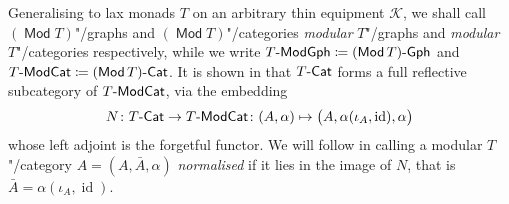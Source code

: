 \documentclass[preprint, a4paper]{elsarticle}
\theoremstyle{definition}
\theoremstyle{remark}
\providecommand{\dfn}{\coloneqq}
\providecommand{\bigpars}[1]{\bigl(#1\bigr)}
\providecommand{\map}[3]{#1\colon#2\to#3}
\DeclareMathOperator{\id}{id}
\providecommand{\catvar}[1]{\mathcal{#1}}
\providecommand{\2}{\mathsf 2}
\providecommand{\K}{\catvar K}
\providecommand{\Cat}{\mathsf{Cat}}
\providecommand{\enCat}[1]{#1\text-\Cat}
\DeclareMathOperator{\Mod}{\mathsf{Mod}}
\providecommand{\ModCat}[1]{#1\text-\mathsf{ModCat}}
\providecommand{\Gph}[1]{#1\text-\mathsf{Gph}}
\providecommand{\ModGph}[1]{#1\text-\mathsf{ModGph}}
\begin{document}
  Generalising to lax monads $T$ on an arbitrary thin equipment $\K$, we shall call $(\Mod T)$"/graphs and $(\Mod T)$"/categories \emph{modular} $T$"/graphs and \emph{modular} $T$"/categories respectively, while we write $\ModGph T \dfn \Gph{(\Mod T)}$ and $\ModCat T \dfn \enCat{(\Mod T)}$. It is shown in \cite{Tholen09} that $\enCat T$ forms a full reflective subcategory of $\ModCat T$, via the embedding
  \begin{equation} \label{normalised T-category}
  	\map N{\enCat T}{\ModCat T}\colon (A, \alpha) \mapsto \bigpars{A, \alpha(\iota_A, \id), \alpha}
  \end{equation}
  whose left adjoint is the forgetful functor. We will follow \cite{Cruttwell-Shulman10} in calling a modular $T$"/category $A = (A, \bar A, \alpha)$ \emph{normalised} if it lies in the image of $N$, that is $\bar A = \alpha(\iota_A, \id)$.
  
\end{document}
